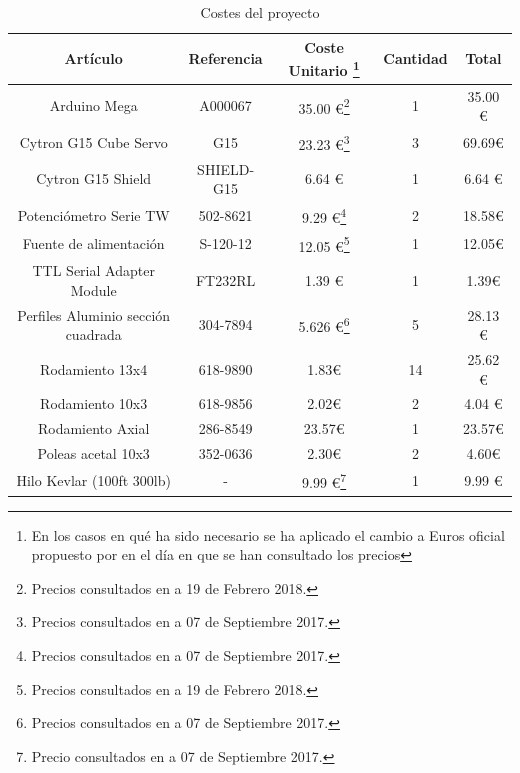     \begin{table}[H]
    \caption{Costes del proyecto}
    \label{tab:presupuesto}
    \begin{center}
    \begin{minipage}{\textwidth}
    \begin{tabular}{ |c|c|c|c|c| }
    \hline
    \textbf{Artículo} & \textbf{Referencia} & \textbf{Coste Unitario} \footnote{En los casos en qué ha sido necesario se ha aplicado el cambio a Euros oficial propuesto por \cite{bancoEspana} en el día en que se han consultado los precios} & \textbf{Cantidad} & \textbf{Total} \\
    \hline
    \hline
    Arduino Mega & A000067 & 35.00 \euro\footnote{Precios consultados en \cite{arduinoStore} a 19 de Febrero 2018.} & 1 & 35.00 \euro\\
    \hline
    \hline
    Cytron G15 Cube Servo & G15 & 23.23 \euro\footnote{Precios consultados en \cite{cytronStore} a 07 de Septiembre 2017.} & 3 & 69.69\euro \\
    Cytron G15 Shield & SHIELD-G15 & 6.64 \euro & 1 & 6.64 \euro\\
    \hline
    \hline
    Potenciómetro Serie TW & 502-8621 &  9.29 \euro\footnote{Precios consultados en \cite{rsStore} a 07 de Septiembre 2017.} & 2 & 18.58\euro \\
    \hline
    \hline
    Fuente de alimentación & S-120-12  &  12.05 \euro\footnote{Precios consultados en \cite{aliexpres} a 19 de Febrero 2018.} & 1 & 12.05\euro \\
    TTL Serial Adapter Module & FT232RL  &  1.39 \euro & 1 & 1.39\euro \\
    \hline
    \hline
    Perfiles Aluminio sección cuadrada & 304-7894 & 5.626 \euro\footnote{Precios consultados en \cite{rsStore} a 07 de Septiembre 2017.} & 5 & 28.13 \euro \\
    Rodamiento 13x4 & 618-9890 & 1.83\euro & 14 & 25.62 \euro \\
    Rodamiento 10x3 & 618-9856 & 2.02\euro & 2 & 4.04 \euro \\
    Rodamiento Axial & 286-8549 & 23.57\euro & 1 & 23.57\euro \\
    Poleas acetal 10x3 & 352-0636 & 2.30\euro & 2 & 4.60\euro \\
    \hline
    \hline
    Hilo Kevlar (100ft 300lb) &-& 9.99 \euro\footnote{Precio consultados en \cite{emmakites} a 07 de Septiembre 2017.} & 1 & 9.99 \euro \\

\end{tabular}
\end{minipage}
\end{center}
\end{table}
